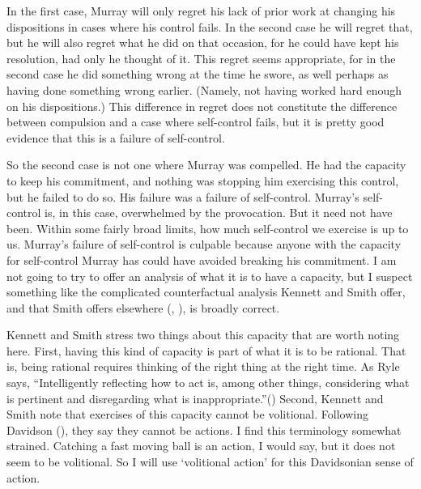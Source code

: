 \documentclass[
  11pt,
  letterpaper,
  DIV=11,
  numbers=noendperiod,
  oneside]{scrartcl}
\begin{document}
In the first case, Murray will only regret his lack of prior work at
changing his dispositions in cases where his control fails. In the
second case he will regret that, but he will also regret what he did on
that occasion, for he could have kept his resolution, had only he
thought of it. This regret seems appropriate, for in the second case he
did something wrong at the time he swore, as well perhaps as having done
something wrong earlier. (Namely, not having worked hard enough on his
dispositions.) This difference in regret does not constitute the
difference between compulsion and a case where self-control fails, but
it is pretty good evidence that this is a failure of self-control.

So the second case is not one where Murray was compelled. He had the
capacity to keep his commitment, and nothing was stopping him exercising
this control, but he failed to do so. His failure was a failure of
self-control. Murray's self-control is, in this case, overwhelmed by the
provocation. But it need not have been. Within some fairly broad limits,
how much self-control we exercise is up to us. Murray's failure of
self-control is culpable because anyone with the capacity for
self-control Murray has could have avoided breaking his commitment. I am
not going to try to offer an analysis of what it is to have a capacity,
but I suspect something like the complicated counterfactual analysis
Kennett and Smith offer, and that Smith offers elsewhere
(,
), is broadly correct.

Kennett and Smith stress two things about this capacity that are worth
noting here. First, having this kind of capacity is part of what it is
to be rational. That is, being rational requires thinking of the right
thing at the right time. As Ryle says, ``Intelligently reflecting how to
act is, among other things, considering what is pertinent and
disregarding what is inappropriate.''() Second, Kennett and Smith note that exercises of this capacity
cannot be volitional. Following Davidson
(), they say they cannot be actions. I
find this terminology somewhat strained. Catching a fast moving ball is
an action, I would say, but it does not seem to be volitional. So I will
use `volitional action' for this Davidsonian sense of action.
\end{document}
